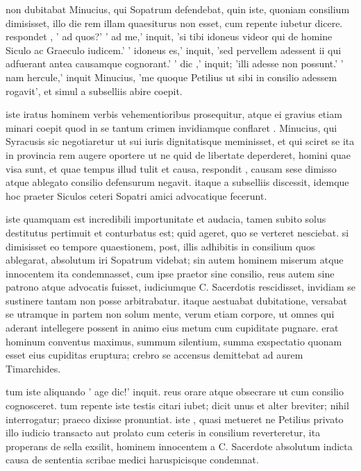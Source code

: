  non dubitabat Minucius, qui Sopatrum defendebat, quin iste, quoniam consilium dimisisset, illo die rem illam quaesiturus non esset, cum repente iubetur dicere. respondet , ' ad quos?' ' ad me,' inquit, 'si tibi idoneus videor qui de homine Siculo ac Graeculo iudicem.' ' idoneus es,' inquit, 'sed pervellem adessent ii qui adfuerant antea causamque cognorant.' ' dic ,' inquit; 'illi adesse non possunt.' ' nam hercule,' inquit Minucius, 'me quoque Petilius ut sibi in consilio adessem rogavit', et simul a subselliis abire coepit.

 iste iratus hominem verbis vehementioribus prosequitur, atque ei gravius etiam minari coepit quod in se tantum crimen invidiamque conflaret . Minucius, qui Syracusis sic negotiaretur ut sui iuris dignitatisque meminisset, et qui sciret se ita in provincia rem augere oportere ut ne quid de libertate deperderet, homini quae visa sunt, et quae tempus illud tulit et causa, respondit , causam sese dimisso atque ablegato consilio defensurum negavit. itaque a subselliis discessit, idemque hoc praeter Siculos ceteri Sopatri amici advocatique fecerunt.

 iste quamquam est incredibili importunitate et audacia, tamen subito solus destitutus pertimuit et conturbatus est; quid ageret, quo se verteret nesciebat. si dimisisset eo tempore quaestionem, post, illis adhibitis in consilium quos ablegarat, absolutum iri Sopatrum videbat; sin autem hominem miserum atque innocentem ita condemnasset, cum ipse praetor sine consilio, reus autem sine patrono atque advocatis fuisset, iudiciumque C. Sacerdotis rescidisset, invidiam se sustinere tantam non posse arbitrabatur. itaque aestuabat dubitatione, versabat se utramque in partem non solum mente, verum etiam corpore, ut omnes qui aderant intellegere possent in animo eius metum cum cupiditate pugnare. erat hominum conventus maximus, summum silentium, summa exspectatio quonam esset eius cupiditas eruptura; crebro se accensus demittebat ad aurem Timarchides.

 tum iste aliquando ' age dic!' inquit. reus orare atque obsecrare ut cum consilio cognosceret. tum repente iste testis citari iubet; dicit unus et alter breviter; nihil interrogatur; praeco dixisse pronuntiat. iste , quasi metueret ne Petilius privato illo iudicio transacto aut prolato cum ceteris in consilium reverteretur, ita properans de sella exsilit, hominem innocentem a C. Sacerdote absolutum indicta causa de sententia scribae medici haruspicisque condemnat.

